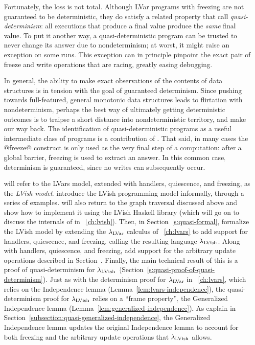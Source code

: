 Fortunately, the loss is not total.  Although LVar programs with
freezing are not guaranteed to be deterministic, they do satisfy a
related property that  call \emph{quasi-determinism}: all executions
that produce a final value produce the \emph{same} final value.  To
put it another way, a quasi-deterministic program can be trusted to
never change its answer due to nondeterminism; at worst, it might
raise an exception on some runs.  This exception can in principle
pinpoint the exact pair of freeze and write operations that are
racing, greatly easing debugging.

In general, the ability to make exact observations of the contents of
data structures is in tension with the goal of guaranteed determinism.
Since pushing towards full-featured, general monotonic data structures
leads to flirtation with nondeterminism, perhaps the best way of
ultimately getting deterministic outcomes is to traipse a short
distance into nondeterministic territory, and make our way back.  The
identification of quasi-deterministic programs as a useful
intermediate class of programs is a contribution of .
That said, in many cases the @freeze@ construct is only used as the
very final step of a computation: after a global barrier, freezing is
used to extract an answer.  In this common case, determinism is
guaranteed, since no writes can subsequently occur.

 will refer to the LVars model, extended with handlers, quiescence,
and freezing, as the \emph{LVish model}.   introduce
the LVish programming model informally, through a series of examples.
 will also return to the graph traversal  discussed above and show
how to implement it using the LVish Haskell library (which  will go
on to discuss the internals of in ~\ref{ch:lvish}).  Then, in
Section~\ref{s:quasi-formal},  formalize the LVish model by extending
the $\lambda_{\textrm{LVar}}$ calculus of ~\ref{ch:lvars} to add support
for handlers, quiescence, and freezing, calling the resulting language
$\lambda_{\textrm{LVish}}$.  Along with handlers, quiescence, and freezing,  add
support for the arbitrary update operations described in
Section~\either{\ref{subsection:lvars-generalizing-from-least-upper-bound-writes}}{\ref{s:lvars-generalizing}}.
Finally, the main technical result of this  is a proof of
quasi-determinism for
$\lambda_{\textrm{LVish}}$~(Section~\ref{s:quasi-proof-of-quasi-determinism}). Just
as with the determinism proof  for $\lambda_{\textrm{LVar}}$ in
~\ref{ch:lvars}, which relies on the Independence lemma
(Lemma~\ref{lem:lvars-independence}), the quasi-determinism proof for
$\lambda_{\textrm{LVish}}$ relies on a ``frame property'', the Generalized
Independence lemma (Lemma~\ref{lem:generalized-independence}).  As 
explain in Section~\ref{subsection:quasi-generalized-independence},
the Generalized Independence lemma updates the original Independence
lemma to account for both freezing and the arbitrary update operations
that $\lambda_{\textrm{LVish}}$ allows.
